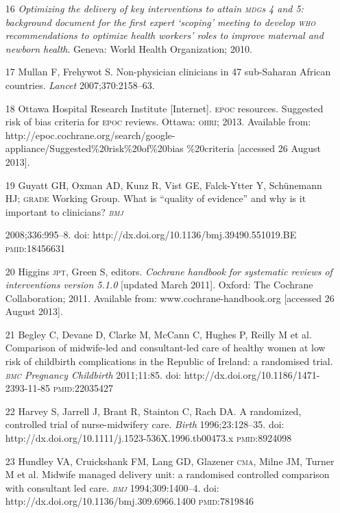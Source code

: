 \documentclass{article}
\begin{document}
\begin{itemize}
\item[16] \textit{Optimizing the delivery of key interventions to attain \textsc{mdg}s 4
and 5:
background document for the first expert ‘scoping' meeting to develop \textsc{who}
recommendations to optimize health workers' roles to improve maternal and
newborn
health}. Geneva: World Health Organization; 2010.

\item[17] Mullan F, Frehywot S. Non-physician clinicians in 47 sub-Saharan
African countries.
\textit{Lancet}
2007;370:2158–63.

\item[18] Ottawa Hospital Research Institute [Internet]. \textsc{epoc} resources.
Suggested risk of
bias criteria for \textsc{epoc} reviews. Ottawa: \textsc{ohri}; 2013. Available from:
http://epoc.cochrane.org/search/google-appliance/Suggested\%20risk\%20of\%20bias
\%20criteria [accessed
26 August 2013].

\item[19] Guyatt GH, Oxman AD, Kunz R, Vist GE, Falck-Ytter Y, Schünemann HJ;
\textsc{grade} Working
Group. What is “quality of evidence” and why is it important to clinicians?
\textit{\textsc{bmj}}

2008;336:995–8. doi: http://dx.doi.org/10.1136/bmj.39490.551019.BE \textsc{pmid}:18456631

\item[20] Higgins \textsc{jpt}, Green S, editors. \textit{Cochrane handbook for
systematic reviews of
interventions version 5.1.0}
[updated March 2011]. Oxford: The Cochrane Collaboration; 2011.
Available from: www.cochrane-handbook.org [accessed 26 August 2013].

\item[21] Begley C, Devane D, Clarke M, McCann C, Hughes P, Reilly M et al.
Comparison of
midwife-led and consultant-led care of healthy women at low risk of childbirth
complications in the
Republic of Ireland: a randomised trial. \textit{\textsc{bmc} Pregnancy Childbirth}
2011;11:85. doi:
http://dx.doi.org/10.1186/1471-2393-11-85 \textsc{pmid}:22035427

\item[22] Harvey S, Jarrell J, Brant R, Stainton C, Rach DA. A randomized,
controlled trial of
nurse-midwifery care. \textit{Birth}
1996;23:128–35. doi:
http://dx.doi.org/10.1111/j.1523-536X.1996.tb00473.x \textsc{pmid}:8924098

\item[23] Hundley VA, Cruickshank FM, Lang GD, Glazener \textsc{cma}, Milne JM, Turner M
et al. Midwife
managed delivery unit: a randomised controlled comparison with consultant led
care.
\textit{\textsc{bmj}}
1994;309:1400–4. doi: http://dx.doi.org/10.1136/bmj.309.6966.1400
\textsc{pmid}:7819846


\end{itemize}
\end{document}
